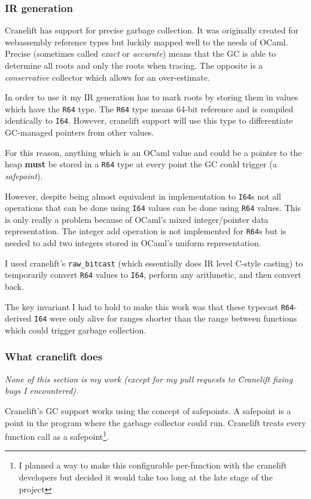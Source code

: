 \subsubsection{IR generation} \label{gc-ir}

Cranelift has support for precise garbage collection. It was originally created for webassembly
reference types but luckily mapped well to the needs of OCaml. Precise (sometimes called
\emph{exact} or \emph{accurate}) means that the GC is able to determine all roots and only the
roots
when tracing. The opposite is a \emph{conservative} collector which allows for an over-estimate.

In order to use it my IR generation has to mark roots by storing them in values which have the
\texttt{R64} type. The \texttt{R64} type means 64-bit reference and is compiled identically to
\texttt{I64}. However, cranelift support will use this type to differentiate GC-managed pointers
from other values.

For this reason, anything which is an OCaml value and could be a pointer to the heap \textbf{must}
be stored in a \texttt{R64} type at every point the GC could trigger (a \emph{safepoint}).

However, despite being almost equivalent in implementation to \texttt{I64}s not all operations that
can be done using \texttt{I64} values can be done using \texttt{R64} values. This is only really a
problem because of OCaml's mixed integer/pointer data representation. The integer add operation is
not
implemented for \texttt{R64}s but is needed to add two integers stored in OCaml's uniform
representation.

I used cranelift's \texttt{raw\_bitcast} (which essentially does IR level C-style casting) to
temporarily convert \texttt{R64} values to \texttt{I64}, perform any arithmetic, and then convert
back.

The key invariant I had to hold to make this work was that these typecast \texttt{R64}-derived
\texttt{I64} were only alive for ranges shorter than the range between functions which could
trigger
garbage collection.

\subsubsection{What cranelift does}

\emph{None of this section is my work (except for my pull requests to Cranelift fixing bugs I
      encountered).}

Cranelift's GC support works using the concept of safepoints. A safepoint is a point in the program
where the garbage collector could run. Cranelift treats every function call as a
safepoint\footnote{I planned a way to make this configurable per-function with the cranelift
      developers but decided it would take too long at the late stage of the project}.

